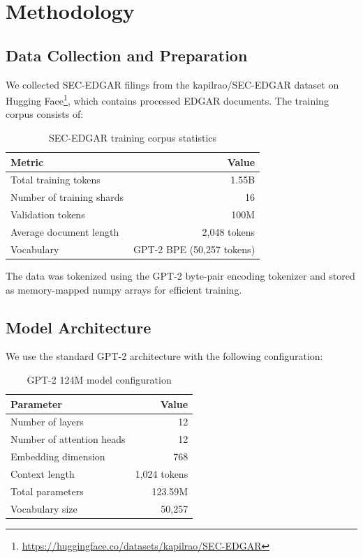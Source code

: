 \documentclass[12pt]{article}
\begin{document}
\section{Methodology}

\subsection{Data Collection and Preparation}

We collected SEC-EDGAR filings from the kapilrao/SEC-EDGAR dataset on Hugging Face\footnote{\url{https://huggingface.co/datasets/kapilrao/SEC-EDGAR}}, which contains processed EDGAR documents. The training corpus consists of:

\begin{table}[H]
\centering
\begin{tabular}{lr}
\toprule
\textbf{Metric} & \textbf{Value} \\
\midrule
Total training tokens & 1.55B \\
Number of training shards & 16 \\
Validation tokens & 100M \\
Average document length & ~2,048 tokens \\
Vocabulary & GPT-2 BPE (50,257 tokens) \\
\bottomrule
\end{tabular}
\caption{SEC-EDGAR training corpus statistics}
\label{tab:corpus}
\end{table}

The data was tokenized using the GPT-2 byte-pair encoding tokenizer and stored as memory-mapped numpy arrays for efficient training.

\subsection{Model Architecture}

We use the standard GPT-2 architecture with the following configuration:

\begin{table}[H]
\centering
\begin{tabular}{lr}
\toprule
\textbf{Parameter} & \textbf{Value} \\
\midrule
Number of layers & 12 \\
Number of attention heads & 12 \\
Embedding dimension & 768 \\
Context length & 1,024 tokens \\
Total parameters & 123.59M \\
Vocabulary size & 50,257 \\
\bottomrule
\end{tabular}
\caption{GPT-2 124M model configuration}
\label{tab:model}
\end{table}
\end{document}
